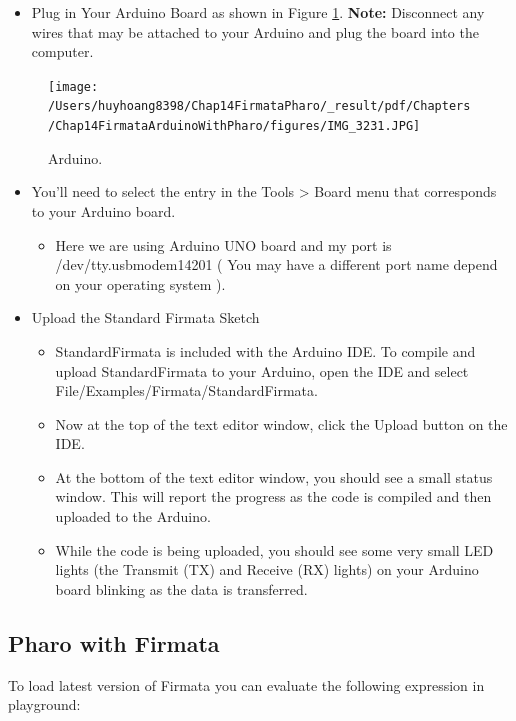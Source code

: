 \documentclass[10pt,twoside,english]{_support/latex/sbabook/sbabook}
\begin{document}
\begin{itemize}
\item Plug in Your Arduino Board as shown in Figure \ref{ArduinoConnection}. \textbf{Note:} Disconnect any wires that may be attached to your Arduino and plug the board into the computer.
\end{itemize}


\begin{figure}

\begin{center}
\texttt{[image: /Users/huyhoang8398/Chap14FirmataPharo/\_result/pdf/Chapters/Chap14FirmataArduinoWithPharo/figures/IMG\_3231.JPG]}\caption{Arduino.\label{ArduinoConnection}}\end{center}
\end{figure}


\begin{itemize}
\item You'll need to select the entry in the Tools \textgreater{} Board menu that corresponds to your Arduino board. 
\begin{itemize}
\item Here we are using Arduino UNO board and my port is /dev/tty.usbmodem14201 ( You may have a different port name depend on your operating system ).
\end{itemize}

\item Upload the Standard Firmata Sketch
\begin{itemize}
\item StandardFirmata is included with the Arduino IDE. To compile and upload StandardFirmata to your Arduino, open the IDE and select File/Examples/Firmata/StandardFirmata. 
\item Now at the top of the text editor window, click the Upload button on the IDE.
\item At the bottom of the text editor window, you should see a small status window. This will report the progress as the code is compiled and then uploaded to the Arduino. 
\item While the code is being uploaded, you should see some very small LED lights (the Transmit (TX) and Receive (RX) lights) on your Arduino board blinking as the data is transferred.
\end{itemize}

\end{itemize}
\subsection{Pharo with Firmata}
To load latest version of Firmata you can evaluate the following expression in playground:
\end{document}
